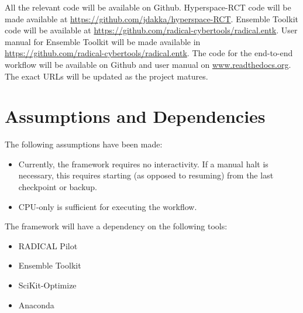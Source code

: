 \documentclass{scrreprt}
\begin{document}
All the relevant code will be available on Github. Hyperspace-RCT code will be made available at \url{https://github.com/jdakka/hyperspace-RCT}. Ensemble Toolkit code will be available at \url{https://github.com/radical-cybertools/radical.entk}. User manual for Ensemble Toolkit will be made available in \url{https://github.com/radical-cybertools/radical.entk}. The code for the end-to-end workflow will be available on Github and user manual on \url{www.readthedocs.org}. The exact URLs will be updated as the project matures.


\section{Assumptions and Dependencies}



The following assumptions have been made:
\begin{itemize}[noitemsep]
\item Currently, the framework requires no interactivity. If a manual halt is necessary, this requires starting (as opposed to resuming) from the last checkpoint or backup.
\item CPU-only is sufficient for executing the workflow.
\end{itemize}

The framework will have a dependency on the following tools:

\begin{itemize}[noitemsep]
\item RADICAL Pilot
\item Ensemble Toolkit
\item SciKit-Optimize
\item Anaconda 
\end{itemize}



\end{document}
